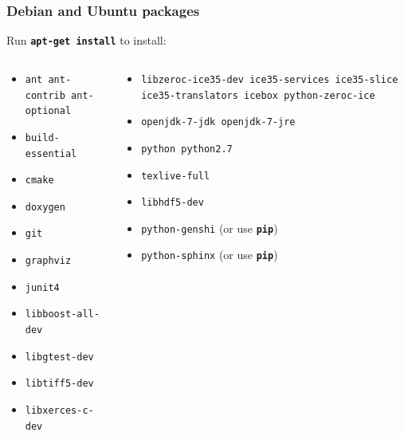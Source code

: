 \documentclass{beamer}
\newcommand{\cmd}[1]{\textbf{\texttt{#1}}}
\newcommand{\pkg}[1]{\texttt{#1}}
\begin{document}
\begin{frame}
  \frametitle{Debian and Ubuntu packages}
  \scriptsize
  Run \cmd{apt-get install} to install:
  \begin{columns}
    \begin{column}{.5\linewidth}
      \begin{itemize}
      \item[] \pkg{ant ant-contrib ant-optional}
      \item[] \pkg{build-essential}
      \item[] \pkg{cmake}
      \item[] \pkg{doxygen}
      \item[] \pkg{git}
      \item[] \pkg{graphviz}
      \item[] \pkg{junit4}
      \item[] \pkg{libboost-all-dev}
      \item[] \pkg{libgtest-dev}
      \item[] \pkg{libtiff5-dev}
      \item[] \pkg{libxerces-c-dev}
      \end{itemize}
    \end{column}
    \begin{column}{.5\linewidth}
      \begin{itemize}
      \item[] \pkg{libzeroc-ice35-dev ice35-services ice35-slice ice35-translators icebox python-zeroc-ice}
      \item[] \pkg{openjdk-7-jdk openjdk-7-jre}
      \item[] \pkg{python python2.7}
      \item[] \pkg{texlive-full}
      \item[] \pkg{libhdf5-dev}
      \item[] \pkg{python-genshi} (or use \cmd{pip})
      \item[] \pkg{python-sphinx} (or use \cmd{pip})
      \end{itemize}
    \end{column}
  \end{columns}
\end{frame}
\end{document}
